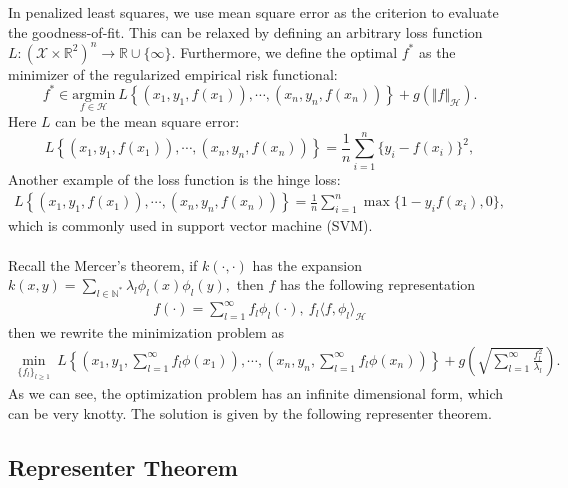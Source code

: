 \documentclass{article}
\begin{document}
In penalized least squares, we use mean square error as the criterion to evaluate the goodness-of-fit. This can be relaxed by defining an arbitrary loss function $L:(\mathcal{X}\times\mathbb{R}^2)^n \to \mathbb{R}\cup\lbrace\infty\rbrace.$  Furthermore, we define the optimal $f^*$ as the minimizer of the regularized empirical risk functional:
\begin{equation*}
	f^* \in \underset{f\in\mathcal{H}}{\mathrm{argmin}}\ L\left\lbrace\left(x_1,y_1,f(x_1)\right),\cdots,\left(x_n,y_n,f(x_n)\right)\right\rbrace + g(\Vert f\Vert_\mathcal{H}).\tag{6.3}
\end{equation*}
Here $L$ can be the mean square error:
\begin{equation*}
	L\left\lbrace\left(x_1,y_1,f(x_1)\right),\cdots,\left(x_n,y_n,f(x_n)\right)\right\rbrace = \frac{1}{n}\sum_{i=1}^n\lbrace y_i - f(x_i)\rbrace^2,\tag{6.4}
\end{equation*}
Another example of the loss function is the hinge loss:
\begin{align*}
	L\left\lbrace\left(x_1,y_1,f(x_1)\right),\cdots,\left(x_n,y_n,f(x_n)\right)\right\rbrace = \frac{1}{n}\sum_{i=1}^n\max\lbrace 1-y_if(x_i), 0\rbrace,\tag{6.5}
\end{align*}
which is commonly used in support vector machine (SVM).

\paragraph{} Recall the Mercer's theorem, if $k(\cdot,\cdot)$ has the expansion $k(x,y)=\sum_{l\in\mathbb{N}^*}\lambda_l\phi_l(x)\phi_l(y),$ then $f$ has the following representation
\begin{align*}
	f(\cdot)=\sum_{l=1}^\infty f_l\phi_l(\cdot),\ f_l\langle f,\phi_l\rangle_{\mathcal{H}}\tag{6.6}
\end{align*}
then we rewrite the minimization problem as
\begin{align*}
	\underset{\lbrace f_l\rbrace_{l\geq 1}}{\min}\ L\left\lbrace\left(x_1,y_1,\sum_{l=1}^\infty f_l\phi(x_1)\right),\cdots,\left(x_n,y_n,\sum_{l=1}^\infty f_l\phi(x_n)\right)\right\rbrace + g\left(\sqrt{\sum_{l=1}^\infty \frac{f_l^2}{\lambda_l}}\right).\tag{6.7}
\end{align*}
As we can see, the optimization problem has an infinite dimensional form, which can be very knotty. The solution is given by the following representer theorem.

\subsection{Representer Theorem}
\end{document}

